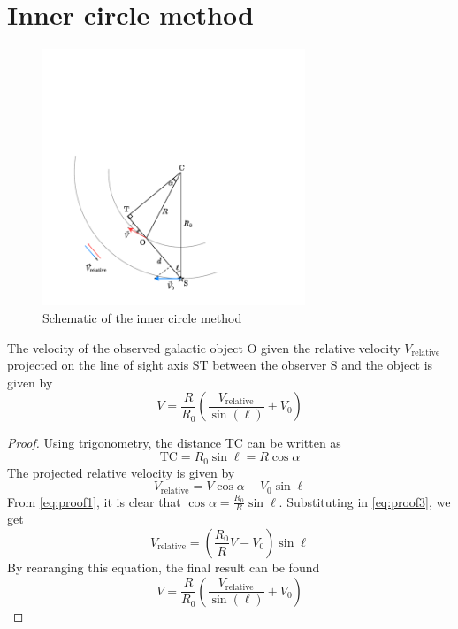 \section{Inner circle method}

\begin{figure}[htbp]
    \centering
    \includegraphics[width=0.7\textwidth]{figures/inner_circle_method.pdf}
    \caption{Schematic of the inner circle method}
    \label{fig:inner_circle_method}
\end{figure}

The velocity of the observed galactic object O given the relative velocity $V_\textrm{relative}$ projected on the line of sight axis ST between the observer S and the object is given by
\begin{equation}
    V = \frac{R}{R_0} \left( \frac{V_\textrm{relative}}{\sin(\ell)} + V_0 \right)
\end{equation}

\begin{proof}
    Using trigonometry, the distance TC can be written as
    \begin{equation}
       \textrm{TC} = R_0 \sin\ell = R \cos\alpha
       \label{eq:proof1}
    \end{equation}
    The projected relative velocity is given by
    \begin{equation}
        V_\textrm{relative} = V \cos\alpha - V_0 \sin\ell
       \label{eq:proof3}
    \end{equation}
    From \autoref{eq:proof1}, it is clear that $\cos\alpha = \frac{R_0}{R} \sin\ell$. Substituting in \autoref{eq:proof3}, we get
    \begin{equation}
        V_\textrm{relative} = \left( \frac{R_0}{R} V - V_0 \right) \sin\ell
    \end{equation}
    By rearanging this equation, the final result can be found
    \begin{equation}
        V = \frac{R}{R_0} \left( \frac{V_\textrm{relative}}{\sin(\ell)} + V_0 \right)
    \end{equation}
\end{proof}
